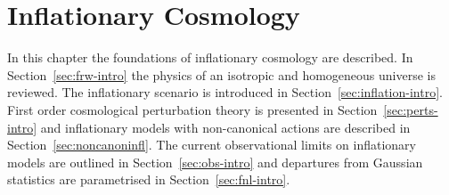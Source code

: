 \renewcommand{\CVSrevision}{\version$Id: mainintro.tex,v 1.55 2009/10/19 13:09:48 ith Exp $}

\chapter{Inflationary Cosmology}
\label{ch:introduction}

In this chapter the foundations of inflationary cosmology are described. 
% 
In Section~\ref{sec:frw-intro} the
physics of
an isotropic and homogeneous universe is reviewed. The inflationary
scenario is introduced in Section~\ref{sec:inflation-intro}. 
First order cosmological perturbation theory is presented in
Section~\ref{sec:perts-intro} and inflationary models with non-canonical actions are
described in Section~\ref{sec:noncanoninfl}.
The current observational limits on inflationary models are outlined in
Section~\ref{sec:obs-intro} and departures from
Gaussian statistics are parametrised in Section~\ref{sec:fnl-intro}.




